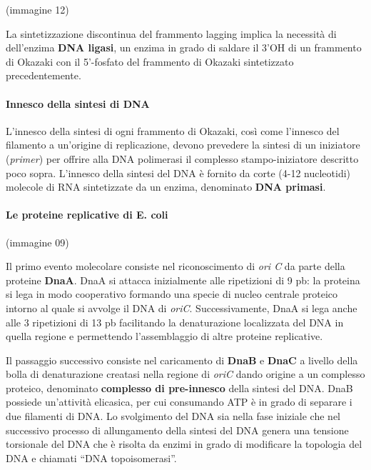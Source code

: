 \documentclass[11pt]{book}
\begin{document}
(immagine 12)

La sintetizzazione discontinua del frammento lagging implica la
necessità di dell'enzima \textbf{DNA ligasi}, un enzima in grado di
saldare il 3'OH di un frammento di Okazaki con il 5'-fosfato del
frammento di Okazaki sintetizzato precedentemente.

\paragraph{Innesco della sintesi di
DNA}\label{innesco-della-sintesi-di-dna}

L'innesco della sintesi di ogni frammento di Okazaki, così come
l'innesco del filamento a un'origine di replicazione, devono prevedere
la sintesi di un iniziatore (\emph{primer}) per offrire alla DNA
polimerasi il complesso stampo-iniziatore descritto poco sopra.
L'innesco della sintesi del DNA è fornito da corte (4-12 nucleotidi)
molecole di RNA sintetizzate da un enzima, denominato \textbf{DNA
primasi}.

\paragraph{Le proteine replicative di E.
coli}\label{le-proteine-replicative-di-e.-coli}

(immagine 09)

Il primo evento molecolare consiste nel riconoscimento di \emph{ori C}
da parte della proteine \textbf{DnaA}. DnaA si attacca inizialmente alle
ripetizioni di 9 pb: la proteina si lega in modo cooperativo formando
una specie di nucleo centrale proteico intorno al quale si avvolge il
DNA di \emph{oriC}. Successivamente, DnaA si lega anche alle 3
ripetizioni di 13 pb facilitando la denaturazione localizzata del DNA in
quella regione e permettendo l'assemblaggio di altre proteine
replicative.

Il passaggio successivo consiste nel caricamento di \textbf{DnaB} e
\textbf{DnaC} a livello della bolla di denaturazione creatasi nella
regione di \emph{oriC} dando origine a un complesso proteico, denominato
\textbf{complesso di pre-innesco} della sintesi del DNA. DnaB possiede
un'attività elicasica, per cui consumando ATP è in grado di separare i
due filamenti di DNA. Lo svolgimento del DNA sia nella fase iniziale che
nel successivo processo di allungamento della sintesi del DNA genera una
tensione torsionale del DNA che è risolta da enzimi in grado di
modificare la topologia del DNA e chiamati ``DNA topoisomerasi''.
\end{document}
